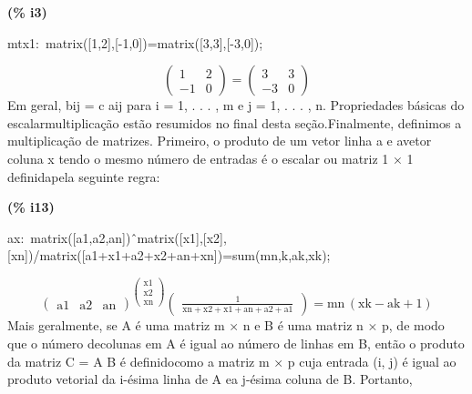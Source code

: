 \documentclass[fleqn]{article}
\begin{document}
\noindent
\begin{minipage}[t]{4.000000em}\color{red}\bfseries
(\% i3)	
\end{minipage}
\begin{minipage}[t]{\textwidth}\color{blue}
mtx1:\ matrix([1,2],[-1,0])=matrix([3,3],[-3,0]);
\end{minipage}
\[\displaystyle \tag{mtx1} 
\begin{pmatrix}1 & 2\\
\mathop{-}1 & 0\end{pmatrix}\mathop{=}\begin{pmatrix}3 & 3\\
\mathop{-}3 & 0\end{pmatrix}\mbox{}
\]
Em geral, bij = c aij para i = 1, . . . , m e j = 1, . . . , n. Propriedades básicas do escalarmultiplicação estão resumidos no final desta seção.Finalmente, definimos a multiplicação de matrizes. Primeiro, o produto de um vetor linha a e avetor coluna x tendo o mesmo número de entradas é o escalar ou matriz 1 × 1 definidapela seguinte regra:


\noindent
\begin{minipage}[t]{4.000000em}\color{red}\bfseries
(\% i13)	
\end{minipage}
\begin{minipage}[t]{\textwidth}\color{blue}
ax:\ matrix([a1,a2,an])\^\ matrix([x1],[x2],[xn])/matrix([a1+x1+a2+x2+an+xn])=sum(mn,k,ak,xk);
\end{minipage}
\[\displaystyle \tag{ax} 
{{\begin{pmatrix}\ensuremath{\mathrm{a1}} & \ensuremath{\mathrm{a2}} & \ensuremath{\mathrm{an}}\end{pmatrix}}^{\begin{pmatrix}\ensuremath{\mathrm{x1}}\\
\ensuremath{\mathrm{x2}}\\
\ensuremath{\mathrm{xn}}\end{pmatrix}}} \begin{pmatrix}\frac{1}{\ensuremath{\mathrm{xn}}\mathop{+}\ensuremath{\mathrm{x2}}\mathop{+}\ensuremath{\mathrm{x1}}\mathop{+}\ensuremath{\mathrm{an}}\mathop{+}\ensuremath{\mathrm{a2}}\mathop{+}\ensuremath{\mathrm{a1}}}\end{pmatrix}\mathop{=}\ensuremath{\mathrm{mn}}\, \left( \ensuremath{\mathrm{xk}}\mathop{-}\ensuremath{\mathrm{ak}}\mathop{+}1\right) \mbox{}
\]
Mais geralmente, se A é uma matriz m × n e B é uma matriz n × p, de modo que o número decolunas em A é igual ao número de linhas em B, então o produto da matriz C = A B é definidocomo a matriz m × p cuja entrada (i, j) é igual ao produto vetorial da i-ésima linha de A ea j-ésima coluna de B. Portanto,
\end{document}
